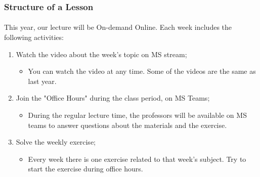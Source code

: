 \documentclass[aspectratio=169]{beamer}
\begin{document}
%
%

\begin{frame}
  \frametitle{Structure of a Lesson}
  \framesubtitle{}

  This year, our lecture will be \alert{On-demand Online}. Each week includes the following activities:
  \bigskip

  \begin{enumerate}
  \item Watch the video about the week's topic on MS stream;
  \begin{itemize}
    \item You can watch the video at any time. Some of the videos are the same as last year.
  \end{itemize}
  \item Join the "Office Hours" during the class period, on MS Teams;
  \begin{itemize}
    \item During the regular lecture time, the professors will be available on MS teams to answer questions about the materials and the exercise.
  \end{itemize}
  \item Solve the weekly exercise;
  \begin{itemize}
    \item Every week there is one exercise related to that week's subject. Try to start the exercise during office hours.
  \end{itemize}
  \end{enumerate}

\end{frame}
\end{document}
